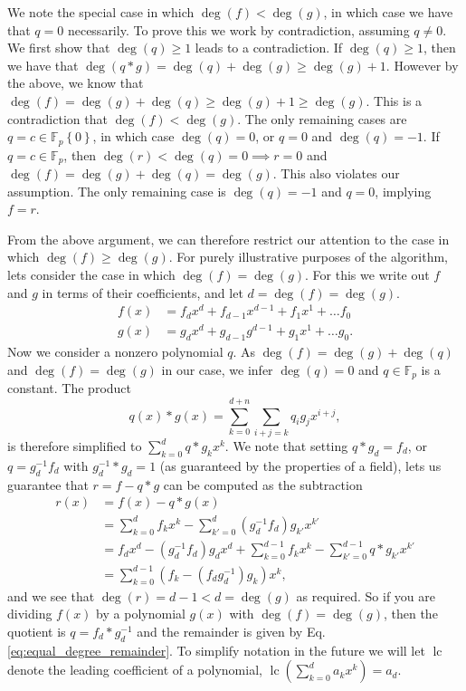 \documentclass{article}
\newcommand{\set}[1]{\left\{ #1 \right\}}
\newcommand{\field}{\mathbb{F}}
\DeclareMathOperator{\lc}{lc}
\begin{document}
We note the special case in which $\deg(f) < \deg(g)$, in which case we have that $q = 0$ necessarily. To prove this we work by contradiction, assuming $q \neq 0$. We first show that $\deg(q) \geq 1$ leads to a contradiction. If $\deg(q) \geq 1$, then we have that $\deg(q * g) = \deg(q) + \deg(g) \geq \deg(g) + 1$. However by the above, we know that $\deg(f) = \deg(g) + \deg(q) \geq \deg(g) + 1 \geq \deg(g)$. This is a contradiction that $\deg(f) < \deg(g)$. The only remaining cases are $q = c \in \field_p \set{0}$, in which case $\deg(q) = 0$, or $q = 0$ and $\deg(q) = -1$. If $q = c \in \field_p$, then $\deg(r) < \deg(q) = 0 \implies r = 0$ and $\deg(f) = \deg(g) + \deg(q) = \deg(g)$. This also violates our assumption. The only remaining case is $\deg(q) = -1$ and $q = 0$, implying $f = r$. 

From the above argument, we can therefore restrict our attention to the case in which $\deg(f) \geq \deg(g)$. For purely illustrative purposes of the algorithm, lets consider the case in which $\deg(f) = \deg(g)$. For this we write out $f$ and $g$ in terms of their coefficients, and let $d = \deg(f) = \deg(g)$. 
\begin{align}
    f(x) &= f_d x^d  + f_{d-1} x^{d-1} + f_1 x^1 + \ldots f_0 \\
    g(x) &= g_d x^d  + g_{d-1} g^{d-1} + g_1 x^1 + \ldots g_0.
\end{align}
Now we consider a nonzero polynomial $q$. As $\deg(f) = \deg(g) + \deg(q)$ and  $\deg(f) = \deg(g)$ in our case, we infer $\deg(q) = 0$ and $q \in \field_p$ is a constant. The product 
\begin{equation}
    q(x) * g(x) = \sum_{k = 0}^{d + n} \sum_{i + j = k} q_i g_j x^{i + j},
\end{equation}
is therefore simplified to $\sum_{k = 0}^{d} q * g_k x^{k}$. We note that setting $q * g_d = f_d$, or $q = g_d^{-1} f_d$ with $g_d^{-1} * g_d = 1$ (as guaranteed by the properties of a field), lets us guarantee that $r = f - q * g$ can be computed as the subtraction
\begin{align}
    r(x) &= f(x) - q * g(x) \\
    &= \sum_{k = 0}^{d} f_k x^k - \sum_{k' = 0}^d (g_d^{-1} f_d) g_{k'} x^{k'} \\
    &= f_d x^d - (g_d^{-1} f_d) g_d x^d + \sum_{k = 0}^{d - 1} f_k x^k - \sum_{k' = 0}^{d - 1} q * g_{k'} x^{k'} \\
    &= \sum_{k = 0}^{d - 1} (f_k - (f_d g_d^{-1} ) g_k) x^k, \label{eq:equal_degree_remainder}
\end{align}
and we see that $\deg(r) = d - 1 < d = \deg(g)$ as required. So if you are dividing $f(x)$ by a polynomial $g(x)$ with $\deg(f) = \deg(g)$, then the quotient is $q = f_d * g_d^{-1}$ and the remainder is given by Eq. \eqref{eq:equal_degree_remainder}. To simplify notation in the future we will let $\lc$ denote the leading coefficient of a polynomial, $\lc(\sum_{k=0}^d a_k x^k) = a_d$.
\end{document}
